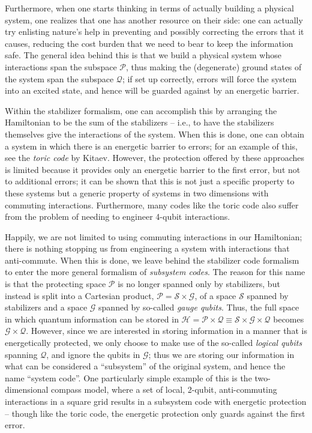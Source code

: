 \documentclass[aps,pra,amsfonts,amsmath,amssymb]{revtex4}
\begin{document}
Furthermore, when one starts thinking in terms of actually building a physical system, one realizes that one has another resource on their side:  one can actually try enlisting nature's help in preventing and possibly correcting the errors that it causes, reducing the cost burden that we need to bear to keep the information safe.  The general idea behind this is that we build a physical system whose interactions span the subspace $\mathscr{P}$, thus making the (degenerate) ground states of the system span the subspace $\mathscr{Q}$;  if set up correctly, errors will force the system into an excited state, and hence will be guarded against by an energetic barrier.

Within the stabilizer formalism, one can accomplish this by arranging the Hamiltonian to be the sum of the stabilizers -- i.e., to have the stabilizers themselves give the interactions of the system.  When this is done, one can obtain a system in which there is an energetic barrier to errors;  for an example of this, see  the \emph{toric code} by Kitaev.  However, the protection offered by these approaches is limited because it  provides only an energetic barrier to the first error, but not to additional errors; it can be shown that this is not just a specific property to these systems but a generic property of systems in two dimensions with commuting interactions.  Furthermore, many codes like the toric code also suffer from the problem of needing to engineer 4-qubit interactions.

Happily, we are not limited to using commuting interactions in our Hamiltonian;  there is nothing stopping us from engineering a system with interactions that anti-commute.  When this is done, we leave behind the stabilizer code formalism to enter the more general formalism of \emph{subsystem codes}.  The reason for this name is that the protecting space $\mathscr{P}$ is no longer spanned only by stabilizers, but instead is split into a Cartesian product, $\mathscr{P}=\mathscr{S}\times\mathscr{G}$, of a space $\mathscr{S}$ spanned by stabilizers and a space $\mathscr{G}$ spanned by so-called \emph{gauge qubits}.  Thus, the full space in which quantum information can be stored in $\mathscr{H}=\mathscr{P}\times\mathscr{Q}\equiv\mathscr{S}\times\mathscr{G}\times\mathscr{Q}$ becomes $\mathscr{G}\times\mathscr{Q}$.  However, since we are interested in storing information in a manner that is energetically protected, we only choose to make use of the so-called \emph{logical qubits} spanning $\mathscr{Q}$, and ignore the qubits in $\mathscr{G}$;  thus we are storing our information in what can be considered a ``subsystem'' of the original system, and hence the name ``system code''.  One particularly simple example of this is the two-dimensional compass model, where a set of local, 2-qubit, anti-commuting interactions in a square grid results in a subsystem code with energetic protection -- though like the toric code, the energetic protection only guards against the first error.

\end{document}
